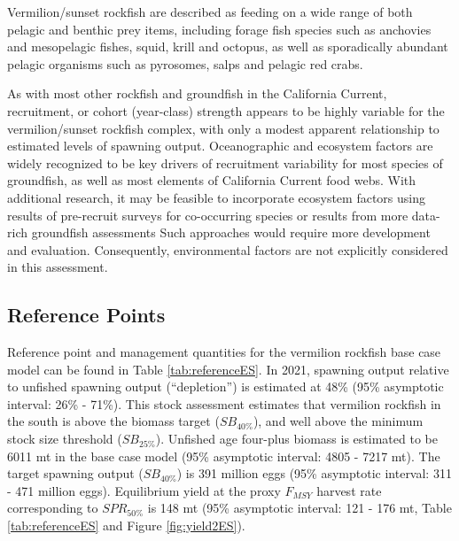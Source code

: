 \documentclass[11pt,
  english,
]{article}
\begin{document}
Vermilion/sunset rockfish are described as feeding on a wide range of both pelagic and benthic prey items, including forage fish species such as anchovies and mesopelagic fishes, squid, krill and octopus, as well as sporadically abundant pelagic organisms such as pyrosomes, salps and pelagic red crabs.

As with most other rockfish and groundfish in the California Current, recruitment, or cohort (year-class) strength appears to be highly variable for the vermilion/sunset rockfish complex, with only a modest apparent relationship to estimated levels of spawning output. Oceanographic and ecosystem factors are widely recognized to be key drivers of recruitment variability for most species of groundfish, as well as most elements of California Current food webs. With additional research, it may be feasible to incorporate ecosystem factors using results of pre-recruit surveys for co-occurring species or results from more data-rich groundfish assessments Such approaches would require more development and evaluation. Consequently, environmental factors are not explicitly considered in this assessment.

\FloatBarrier


\hypertarget{reference-points}{%
\subsection*{Reference Points}\label{reference-points}}

\leavevmode\tagmcend\tagstructend

Reference point and management quantities for the vermilion rockfish base case model can be found in Table \ref{tab:referenceES}. In 2021, spawning output relative to unfished spawning output (``depletion'') is estimated at 48\% (95\% asymptotic interval: 26\% - 71\%). This stock assessment estimates that vermilion rockfish in the south is above the biomass target ({\(SB_{40\%}\)\leavevmode\tagmcend\tagstructend}), and well above the minimum stock size threshold ({\(SB_{25\%}\)\leavevmode\tagmcend\tagstructend}). Unfished age four-plus biomass is estimated to be 6011 mt in the base case model (95\% asymptotic interval: 4805 - 7217 mt). The target spawning output ({\(SB_{40\%}\)\leavevmode\tagmcend\tagstructend}) is 391 million eggs (95\% asymptotic interval: 311 - 471 million eggs). Equilibrium yield at the proxy {\(F_{MSY}\)\leavevmode\tagmcend\tagstructend} harvest rate corresponding to {\(SPR_{50\%}\)\leavevmode\tagmcend\tagstructend} is 148 mt (95\% asymptotic interval: 121 - 176 mt, Table \ref{tab:referenceES} and Figure \ref{fig:yield2ES}).
\end{document}
